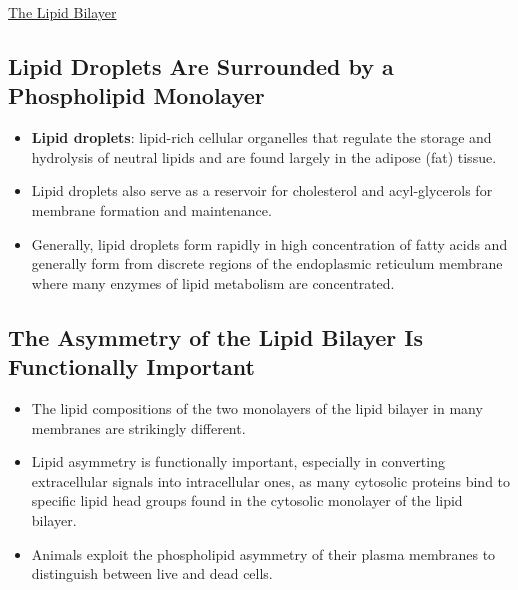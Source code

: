 \documentclass[12pt,letterpaper]{article}
\begin{document}
\begin{secbox}{\hyperlink{10}{The Lipid Bilayer}}
{    \hypertarget{10.4}{\subsection*{Lipid Droplets Are Surrounded by a Phospholipid Monolayer}}
    \begin{itemize}
        \item \textbf{Lipid droplets}: lipid-rich cellular organelles that regulate the storage and hydrolysis of neutral lipids and are found largely in the adipose (fat) tissue. 
        \item Lipid droplets also serve as a reservoir for cholesterol and acyl-glycerols for membrane formation and maintenance.
        \item Generally, lipid droplets form rapidly in high concentration of fatty acids and generally form from discrete regions of the endoplasmic reticulum membrane where many enzymes of lipid metabolism are concentrated.
    \end{itemize}

    \hypertarget{10.5}{\subsection*{The Asymmetry of the Lipid Bilayer Is Functionally Important}}
    \begin{itemize}
        \item The lipid compositions of the two monolayers of the lipid bilayer in many membranes are strikingly different.
        \item Lipid asymmetry is functionally important, especially in converting extracellular signals into intracellular ones, as many cytosolic proteins bind to specific lipid head groups found in the cytosolic monolayer of the lipid bilayer. 
        \item Animals exploit the phospholipid asymmetry of their plasma membranes to
        distinguish between live and dead cells. 
    \end{itemize}
    
}
\end{secbox}
\end{document}
